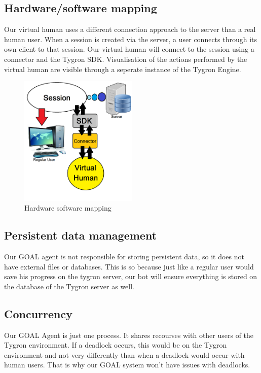 \subsection{Hardware/software mapping}
Our virtual human uses a different connection approach to the server than a real human user. When a session is created via the server, a user connects through its own client to that session. Our virtual human will connect to the session using a connector and the Tygron SDK. Visualisation of the actions performed by the virtual human are visible through a seperate instance of the Tygron Engine.

\begin{figure}
	\centering
	\includegraphics[width=0.5\textwidth]{Hardware_software_mapping}
	\caption{Hardware software mapping}
	\label{fig:Hard_soft_map}
\end{figure}

\subsection{Persistent data management}
Our GOAL agent is not responsible for storing persistent data, so it does not have external files or databases. This is so because just like a regular user would save his progress on the tygron server, our bot will ensure everything is stored on the database of the Tygron server as well.

\subsection{Concurrency}
Our GOAL Agent is just one process. It shares recourses with other users of the Tygron environment. If a deadlock occurs, this would be on the Tygron environment and not very differently than when a deadlock would occur with human users. That is why our GOAL system won't have issues with deadlocks.
\newpage
